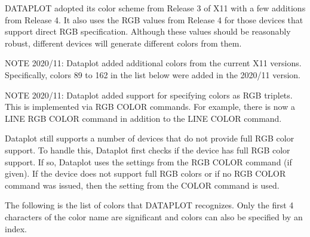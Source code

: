 DATAPLOT adopted its color scheme from Release 3 of X11 with a few
additions from Release 4.  It also uses the RGB values from Release 4
for those devices that support direct RGB specification.  Although these
values should be reasonably robust, different devices will generate
different colors from them.

NOTE 2020/11: Dataplot added additional colors from the current X11
              versions.  Specifically, colors 89 to 162 in the list
              below were added in the 2020/11 version.
 
NOTE 2020/11: Dataplot added support for specifying colors as RGB
              triplets.  This is implemented via RGB COLOR commands.
              For example, there is now a LINE RGB COLOR command in
              addition to the LINE COLOR command.

              Dataplot still supports a number of devices that do not
              provide full RGB color support.  To handle this, Dataplot
              first checks if the device has full RGB color support.
              If so, Dataplot uses the settings from the RGB COLOR
              command (if given).  If the device does not support full
              RGB colors or if no RGB COLOR command was issued, then
              the setting from the COLOR command is used.

The following is the list of colors that DATAPLOT recognizes.  Only the
first 4 characters of the color name are significant and colors can
also be specified by an index.
 
